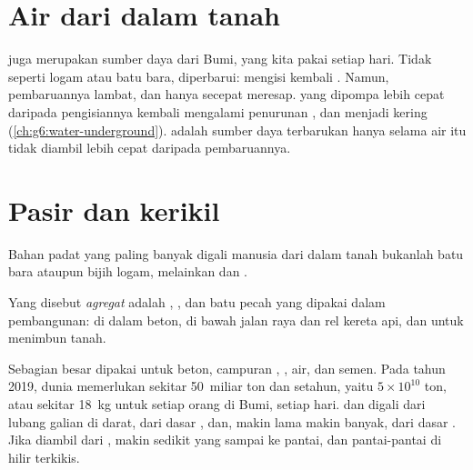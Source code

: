 \section{Air dari dalam tanah}

 juga merupakan sumber daya dari Bumi, yang kita pakai setiap
hari. Tidak seperti logam atau batu bara,  diperbarui: 
mengisi kembali . Namun, pembaruannya lambat, dan hanya secepat
 meresap.  yang dipompa lebih cepat daripada pengisiannya
kembali mengalami penurunan , dan  menjadi kering
(\cref{ch:g6:water-underground}).  adalah sumber daya terbarukan
hanya selama air itu tidak diambil lebih cepat daripada pembaruannya.

\section{Pasir dan kerikil}

Bahan padat yang paling banyak digali manusia dari dalam tanah bukanlah
batu bara ataupun bijih logam, melainkan  dan .

\begin{definition}[Agregat]\label{def:g9:earth-resources:aggregate}
Yang disebut \emph{agregat} adalah , , dan
batu pecah yang dipakai dalam pembangunan: di dalam beton, di bawah jalan
raya dan rel kereta api, dan untuk menimbun tanah.
\end{definition}

Sebagian besar  dipakai untuk beton, campuran , , air,
dan semen. Pada tahun 2019, dunia memerlukan sekitar 50~miliar ton 
dan  setahun, yaitu $5 \times 10^{10}$ ton, atau sekitar
\qty{18}{kg} untuk setiap orang di Bumi, setiap hari.  dan 
digali dari lubang galian di darat, dari dasar , dan, makin lama
makin banyak, dari dasar . Jika diambil dari , makin sedikit
 yang sampai ke pantai, dan pantai-pantai di hilir terkikis.

